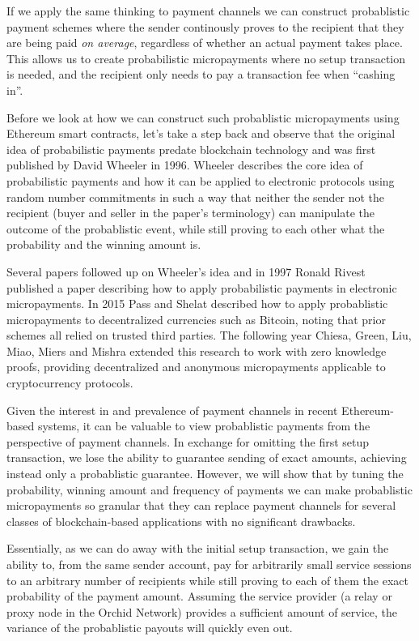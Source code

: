 If we apply the same thinking to payment channels we can construct probablistic payment schemes where the sender continously proves to the recipient that they are being paid \emph{on average}, regardless of whether an actual payment takes place. This allows us to create probabilistic micropayments where no setup transaction is needed, and the recipient only needs to pay a transaction fee when  ``cashing in''.

Before we look at how we can construct such probablistic micropayments using Ethereum smart contracts, let's take a step back and observe that the original idea of probabilistic payments predate blockchain technology and was first published by David Wheeler\cite{txnbets} in 1996. Wheeler describes the core idea of probabilistic payments and how it can be applied to electronic protocols using random number commitments in such a way that neither the sender not the recipient (buyer and seller in the paper's terminology) can manipulate the outcome of the probablistic event, while still proving to each other what the probability and the winning amount is.

Several papers followed up on Wheeler's idea and in 1997 Ronald Rivest\cite{lotterytickets} published a paper describing how to apply probabilistic payments in electronic micropayments. In 2015 Pass and Shelat\cite{Micropayments} described how to apply probablistic micropayments to decentralized currencies such as Bitcoin, noting that prior schemes all relied on trusted third parties. The following year Chiesa, Green, Liu, Miao, Miers and Mishra\cite{DAM} extended this research to work with zero knowledge proofs, providing decentralized and anonymous micropayments applicable to cryptocurrency protocols.

Given the interest in and prevalence of payment channels in recent Ethereum-based systems, it can be valuable to view probablistic payments from the perspective of payment channels. In exchange for omitting the first setup transaction, we lose the ability to guarantee sending of exact amounts, achieving instead only a probablistic guarantee. However, we will show that by tuning the probability, winning amount and frequency of payments we can make probablistic micropayments so granular that they can replace payment channels for several classes of blockchain-based applications with no significant drawbacks.

Essentially, as we can do away with the initial setup transaction, we gain the ability to, from the same sender account, pay for arbitrarily small service sessions to an arbitrary number of recipients while still proving to each of them the exact probability of the payment amount. Assuming the service provider (a relay or proxy node in the Orchid Network) provides a sufficient amount of service, the variance of the probablistic payouts will quickly even out.

